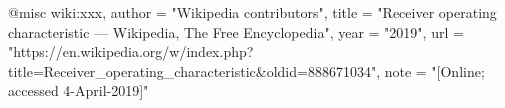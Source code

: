 @misc{ wiki:xxx,
    author = "{Wikipedia contributors}",
    title = "Receiver operating characteristic --- {Wikipedia}{,} The Free Encyclopedia",
    year = "2019",
    url = "https://en.wikipedia.org/w/index.php?title=Receiver_operating_characteristic&oldid=888671034",
    note = "[Online; accessed 4-April-2019]"
  }